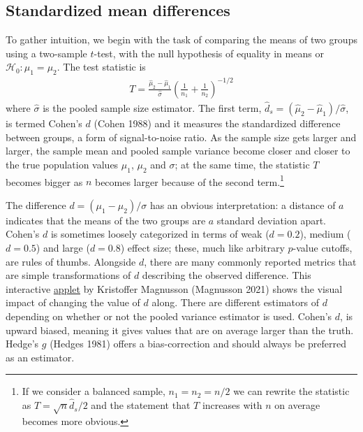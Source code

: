 \documentclass[
  11pt,
  letterpaper,
]{scrbook}
\theoremstyle{definition}
\theoremstyle{remark}
\begin{document}
\hypertarget{standardized-mean-differences}{%
\subsection{Standardized mean
differences}\label{standardized-mean-differences}}

To gather intuition, we begin with the task of comparing the means of
two groups using a two-sample \(t\)-test, with the null hypothesis of
equality in means or \(\mathscr{H}_0: \mu_1 = \mu_2\). The test
statistic is \begin{align*}
T =  \frac{\widehat{\mu}_2 - \widehat{\mu}_1}{\widehat{\sigma}} \left(\frac{1}{n_1}+\frac{1}{n_2}\right)^{-1/2}
\end{align*} where \(\widehat{\sigma}\) is the pooled sample size
estimator. The first term,
\(\widehat{d}_s = (\widehat{\mu}_2 - \widehat{\mu}_1)/\widehat{\sigma}\),
is termed Cohen's \(d\) (Cohen 1988) and it measures the standardized
difference between groups, a form of signal-to-noise ratio. As the
sample size gets larger and larger, the sample mean and pooled sample
variance become closer and closer to the true population values
\(\mu_1\), \(\mu_2\) and \(\sigma\); at the same time, the statistic
\(T\) becomes bigger as \(n\) becomes larger because of the second
term.\footnote{If we consider a balanced sample, \(n_1 = n_2 = n/2\) we
  can rewrite the statistic as \(T = \sqrt{n} \widehat{d}_s/2\) and the
  statement that \(T\) increases with \(n\) on average becomes more
  obvious.}

The difference \(d=(\mu_1-\mu_2)/\sigma\) has an obvious interpretation:
a distance of \(a\) indicates that the means of the two groups are \(a\)
standard deviation apart. Cohen's \(d\) is sometimes loosely categorized
in terms of weak (\(d = 0.2\)), medium (\(d=0.5\)) and large (\(d=0.8\))
effect size; these, much like arbitrary \(p\)-value cutoffs, are rules
of thumbs. Alongside \(d\), there are many commonly reported metrics
that are simple transformations of \(d\) describing the observed
difference. This interactive
\href{https://rpsychologist.com/cohend/}{applet} by Kristoffer Magnusson
(Magnusson 2021) shows the visual impact of changing the value of \(d\)
along. There are different estimators of \(d\) depending on whether or
not the pooled variance estimator is used. Cohen's \(d\), is upward
biased, meaning it gives values that are on average larger than the
truth. Hedge's \(g\) (Hedges 1981) offers a bias-correction and should
always be preferred as an estimator.
\end{document}
